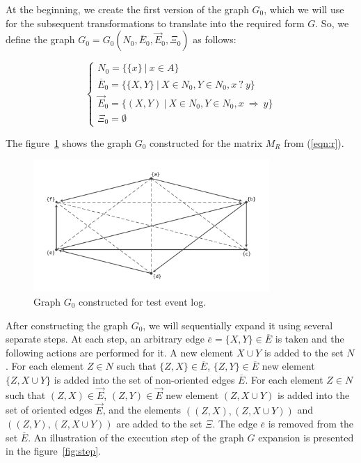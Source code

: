 \documentclass[
11pt,%
tightenlines,%
twoside,%
onecolumn,%
nofloats,%
nobibnotes,%
nofootinbib,%
superscriptaddress,%
noshowpacs,%
centertags]%
{revtex4}
\begin{document}
At the beginning, we create the first version of the graph $G_0$, which we will use for the subsequent transformations to translate into the required form $G$.
So, we define the graph $G_0 = G_0(N_0, \overline{E}_0, \overrightarrow{E}_0, \Xi_0)$ as follows:

\begin{equation}
\begin{cases}
N_0 = \{ \{x\} \ | \ x \in A \} \\
\overline{E}_0 = \{ \{X, Y\} \ | \ X \in N_0, Y \in N_0, x \ ? \ y \} \\
\overrightarrow{E}_0 = \{ (X, Y) \ | \ X \in N_0, Y \in N_0, x \ \Rightarrow \ y \} \\
\Xi_0 = \emptyset
\end{cases}
\end{equation}

The figure~\ref{fig:g_0} shows the graph $G_0$ constructed for the matrix $M_R$ from (\ref{eqn:r}).

\begin{figure}[h]
\setcaptionmargin{5mm}
\onelinecaptionsfalse %
\includegraphics[width=0.8\textwidth]{pics/g_0.pdf}
\caption{Graph $G_0$ constructed for test event log.}
\label{fig:g_0}
\end{figure}

After constructing the graph $G_0$, we will sequentially expand it using several separate steps.
At each step, an arbitrary edge $\overline{e} = \{X, Y\} \in \overline{E}$ is taken and the following actions are performed for it.
A new element $X \cup Y$ is added to the set $N$.
For each element $Z \in N$ such that $\{Z, X\} \in \overline{E}$, $\{Z, Y\} \in \overline{E}$ new element $\{Z, X \cup Y\}$ is added into the set of non-oriented edges $\overline{E}$.
For each element $Z \in N$ such that $(Z, X) \in \overrightarrow{E}$, $(Z, Y) \in \overrightarrow{E}$ new element $(Z, X \cup Y) $ is added  into the set of oriented edges $\overrightarrow{E}$, and the elements $((Z, X), (Z, X \cup Y))$ and $((Z, Y), (Z, X \cup Y))$ are added to the set $\Xi$.
The edge $\overline{e}$ is removed from the set $\overline{E}$.
An illustration of the execution step of the graph $G$ expansion is presented in the figure~\ref{fig:step}.
\end{document}
